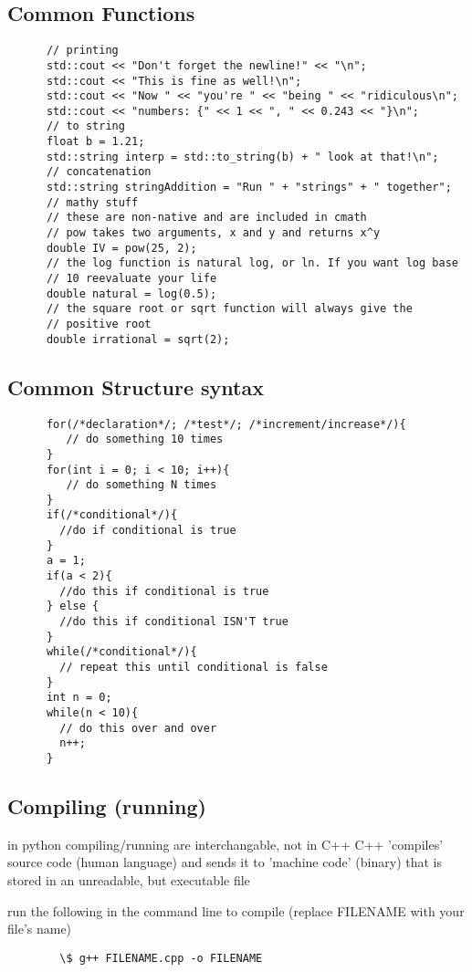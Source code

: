 \documentclass[12pt]{article}
\begin{document}
  \subsection{Common Functions}
    \begin{lstlisting}
      // printing
      std::cout << "Don't forget the newline!" << "\n";
      std::cout << "This is fine as well!\n";
      std::cout << "Now " << "you're " << "being " << "ridiculous\n";
      std::cout << "numbers: {" << 1 << ", " << 0.243 << "}\n";
      // to string
      float b = 1.21;
      std::string interp = std::to_string(b) + " look at that!\n";
      // concatenation
      std::string stringAddition = "Run " + "strings" + " together";
      // mathy stuff
      // these are non-native and are included in cmath
      // pow takes two arguments, x and y and returns x^y
      double IV = pow(25, 2);
      // the log function is natural log, or ln. If you want log base
      // 10 reevaluate your life
      double natural = log(0.5);
      // the square root or sqrt function will always give the
      // positive root
      double irrational = sqrt(2);
    \end{lstlisting}
  \subsection{Common Structure syntax}
    \begin{lstlisting}
      for(/*declaration*/; /*test*/; /*increment/increase*/){
         // do something 10 times 
      }
      for(int i = 0; i < 10; i++){
         // do something N times 
      }
      if(/*conditional*/){
        //do if conditional is true
      }
      a = 1;
      if(a < 2){
        //do this if conditional is true
      } else {
        //do this if conditional ISN'T true
      }
      while(/*conditional*/){
        // repeat this until conditional is false
      }
      int n = 0;
      while(n < 10){
        // do this over and over
        n++;
      }
    \end{lstlisting}
  \subsection{Compiling (running)}
      in python compiling/running are interchangable, not in C++
      C++ 'compiles' source code (human language) and sends it 
      to 'machine code' (binary) that is stored in an
      unreadable, but executable file

      run the following in the command line to compile (replace
      FILENAME with your file's name)
      \begin{verbatim}
        \$ g++ FILENAME.cpp -o FILENAME
      \end{verbatim}
      
\end{document}
